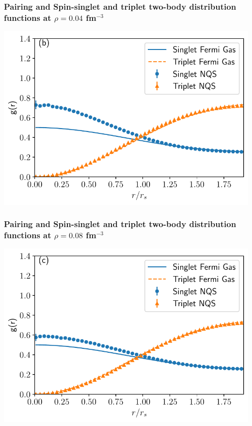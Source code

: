 \documentclass{beamer}
\begin{document}
\begin{frame}
\frametitle{Pairing and Spin-singlet and triplet two-body distribution functions at $\rho=0.04$ fm$^{-3}$}

\begin{block}{}

\vspace{6mm}

\centerline{\includegraphics[width=0.9\linewidth]{figures/04_tbd.pdf}}

\vspace{6mm}

\end{block}
\end{frame}

\begin{frame}
\frametitle{Pairing and Spin-singlet and triplet two-body distribution functions at $\rho=0.08$ fm$^{-3}$}

\begin{block}{}

\vspace{6mm}

\centerline{\includegraphics[width=0.9\linewidth]{figures/08_tbd.pdf}}

\vspace{6mm}

\end{block}
\end{frame}
\end{document}
